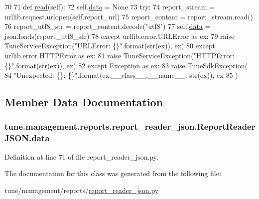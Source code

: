 \begin{DoxyCode}
70 
71     \textcolor{keyword}{def }\hyperlink{classtune_1_1management_1_1reports_1_1report__reader__json_1_1ReportReaderJSON_a9690c4e4ce8f0e9ab5e827eafbc9ccdf}{read}(self):
72         self.\hyperlink{classtune_1_1management_1_1reports_1_1report__reader__json_1_1ReportReaderJSON_a75b908b0ea9e8a3b405eab59294199a4}{data} = \textcolor{keywordtype}{None}
73         \textcolor{keywordflow}{try}:
74             report\_stream = urllib.request.urlopen(self.report\_url)
75             report\_content = report\_stream.read()
76             report\_utf8\_str = report\_content.decode(\textcolor{stringliteral}{"utf8"})
77             self.\hyperlink{classtune_1_1management_1_1reports_1_1report__reader__json_1_1ReportReaderJSON_a75b908b0ea9e8a3b405eab59294199a4}{data} = json.loads(report\_utf8\_str)
78         \textcolor{keywordflow}{except} urllib.error.URLError \textcolor{keyword}{as} ex:
79             \textcolor{keywordflow}{raise} TuneServiceException(\textcolor{stringliteral}{"URLError: \{\}"}.format(str(ex)), ex)
80         \textcolor{keywordflow}{except} urllib.error.HTTPError \textcolor{keyword}{as} ex:
81             \textcolor{keywordflow}{raise} TuneServiceException(\textcolor{stringliteral}{"HTTPError: \{\}"}.format(str(ex)), ex)
82         \textcolor{keywordflow}{except} Exception \textcolor{keyword}{as} ex:
83             \textcolor{keywordflow}{raise} TuneSdkException(
84                 \textcolor{stringliteral}{"Unexpected: \{\}: \{\}"}.format(ex.\_\_class\_\_.\_\_name\_\_, str(ex)), ex
85             )
\end{DoxyCode}


\subsection{Member Data Documentation}
\hypertarget{classtune_1_1management_1_1reports_1_1report__reader__json_1_1ReportReaderJSON_a75b908b0ea9e8a3b405eab59294199a4}{
\subsubsection[{data}]{\setlength{\rightskip}{0pt plus 5cm}tune.\-management.\-reports.\-report\-\_\-reader\-\_\-json.\-Report\-Reader\-J\-S\-O\-N.\-data}}\label{classtune_1_1management_1_1reports_1_1report__reader__json_1_1ReportReaderJSON_a75b908b0ea9e8a3b405eab59294199a4}


Definition at line 71 of file report\-\_\-reader\-\_\-json.\-py.



The documentation for this class was generated from the following file\-:\begin{DoxyCompactItemize}
\item 
tune/management/reports/\hyperlink{report__reader__json_8py}{report\-\_\-reader\-\_\-json.\-py}\end{DoxyCompactItemize}
